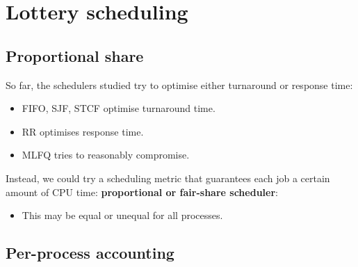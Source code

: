 \chapter{Lottery scheduling}
\label{ch:lottery}




\section{Proportional share}

So far, the schedulers studied try to optimise either turnaround or response time: 

\begin{itemize}
\item FIFO, SJF, STCF optimise turnaround time.
\item RR optimises response time.
\item MLFQ tries to reasonably compromise.
\end{itemize}

Instead, we could try a scheduling metric that guarantees each job a certain amount of CPU time: \textbf{proportional or fair-share scheduler}:

\begin{itemize}
\item This may be equal or unequal for all processes.
\end{itemize}

\section{Per-process accounting}
\label{sec:per-process-accounting}

